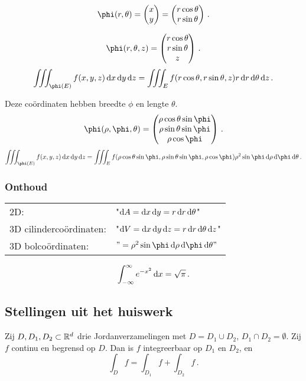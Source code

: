 \documentclass{2wa40summary}
\begin{document}
		\begin{voorbeeld}
			\[ 
				\phi (r,\theta) = \vvec{x \\ y} = \vvec {r \cos \theta \\ r \sin \theta} \,.
			 \]
		\end{voorbeeld}
		\begin{voorbeeld}
			\[ 
				\phi(r,\theta,z) = \vvec{r \cos \theta \\ r \sin \theta \\ z} \,.
			 \]
			 \[ 
				 \iiint_{\phi(E)} f(x,y,z) \d x \d y \d z = \iiint_E f (r \cos \theta, r \sin \theta , z) r \d r \d \theta \d z \,.
			  \]
		\end{voorbeeld}
		\begin{voorbeeld}
			Deze co\"ordinaten hebben breedte $\phi$ en lengte $\theta$.
			\[ 
				\phi(\rho,\phi,\theta) = \vvec{\rho \cos \theta \sin \phi \\ \rho \sin \theta \sin \phi \\ \rho \cos \phi} \,.
			 \]
			 \[ 
				 \iiint_{\phi(E)} f(x,y,z) \d x \d y \d z = \iiint_E f(\rho \cos \theta \sin \phi , \rho \sin \theta \sin \phi , \rho \cos \phi) \rho^2 \sin \phi \d \rho \d \phi \d \theta \,.
			  \]
		\end{voorbeeld}
		\subsubsection{Onthoud}
		\begin{tabular}{ll}
			2D: & "$\mathop{}\!\mathrm{d} A = \mathop{}\!\mathrm{d} x \mathop{}\!\mathrm{d} y = r \mathop{}\!\mathrm{d} r \mathop{}\!\mathrm{d} \theta$" \\
			3D cilinderco\"ordinaten: & "$\mathop{}\!\mathrm{d} V = \mathop{}\!\mathrm{d} x \mathop{}\!\mathrm{d} y \mathop{}\!\mathrm{d} z = r \mathop{}\!\mathrm{d} r \mathop{}\!\mathrm{d} \theta \mathop{}\!\mathrm{d} z $" \\
			3D bolco\"ordinaten: & $"=\rho^2 \sin \phi \d \rho \d \phi \d \theta"$
		\end{tabular}
		
		\begin{theorem}
			\[ 
				\int_{-\infty}^{\infty} e^{-x^2} \mathop{}\!\mathrm{d} x = \sqrt{\pi} \,.
			 \]
		\end{theorem}
		
		\subsection{Stellingen uit het huiswerk}
		\begin{theorem}
			Zij $D,D_1,D_2 \subset \mathbb{R}^d$ drie Jordanverzamelingen met $D=D_1 \cup D_2$, $D_1 \cap D_2 = \emptyset$. Zij $f$ continu en begrensd op $D$. Dan is $f$ integreerbaar op $D_1$ en $D_2$, en \[ 
				\int_D f = \int_{D_1} f + \int_{D_2} f \,.
			 \]
		\end{theorem}
		
\end{document}
